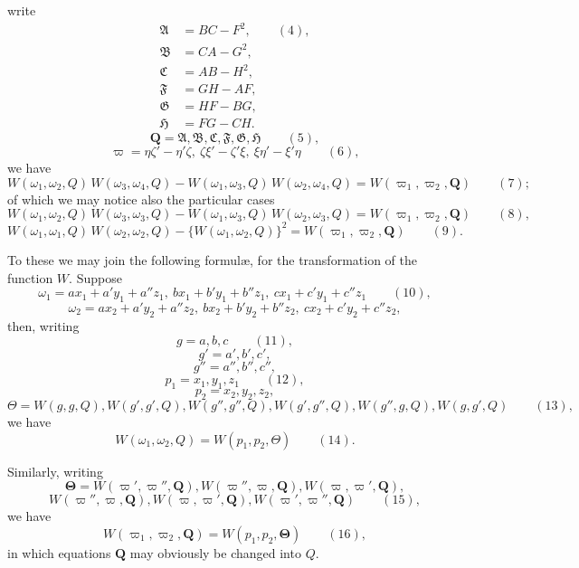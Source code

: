 \documentclass[11pt]{article}
\begin{document}
\newpage
\setcounter{page}{214}

write
\begin{align*}
\mathfrak{A} &= BC - F^2, \qquad (4),\\
\mathfrak{B} &= CA - G^2,\\
\mathfrak{C} &= AB - H^2,\\
\mathfrak{F} &= GH - AF,\\
\mathfrak{G} &= HF - BG,\\
\mathfrak{H} &= FG - CH.
\end{align*}
\[
\mathbf{Q} = \mathfrak{A}, \mathfrak{B}, \mathfrak{C}, \mathfrak{F}, \mathfrak{G}, \mathfrak{H} \qquad (5),
\]
\[
\varpi = \eta\zeta' - \eta'\zeta,\ \zeta\xi' - \zeta'\xi,\ \xi\eta' - \xi'\eta \qquad (6),
\]
we have
\[
W(\omega_1, \omega_2, Q)\,W(\omega_3, \omega_4, Q) - W(\omega_1, \omega_3, Q)\,W(\omega_2, \omega_4, Q) = W(\varpi_1, \varpi_2, \mathbf{Q}) \qquad (7);
\]
of which we may notice also the particular cases
\[
W(\omega_1, \omega_2, Q)\,W(\omega_3, \omega_3, Q) - W(\omega_1, \omega_3, Q)\,W(\omega_2, \omega_3, Q) = W(\varpi_1, \varpi_2, \mathbf{Q}) \qquad (8),
\]
\[
W(\omega_1, \omega_1, Q)\,W(\omega_2, \omega_2, Q) - \{W(\omega_1, \omega_2, Q)\}^2 = W(\varpi_1, \varpi_2, \mathbf{Q}) \qquad (9).
\]

To these we may join the following formul\ae{}, for the transformation of the function $W$. Suppose
\[
\omega_1 = ax_1 + a'y_1 + a''z_1,\ bx_1 + b'y_1 + b''z_1,\ cx_1 + c'y_1 + c''z_1 \qquad (10),
\]
\[
\omega_2 = ax_2 + a'y_2 + a''z_2,\ bx_2 + b'y_2 + b''z_2,\ cx_2 + c'y_2 + c''z_2,
\]
then, writing
\[
g = a, b, c \qquad (11),
\]
\[
g' = a', b', c',
\]
\[
g'' = a'', b'', c'',
\]
\[
p_1 = x_1, y_1, z_1 \qquad (12),
\]
\[
p_2 = x_2, y_2, z_2,
\]
\[
\Theta = W(g, g, Q), W(g', g', Q), W(g'', g'', Q), W(g', g'', Q), W(g'', g, Q), W(g, g', Q) \qquad (13),
\]
we have
\[
W(\omega_1, \omega_2, Q) = W(p_1, p_2, \Theta) \qquad (14).
\]

Similarly, writing
\[
\boldsymbol{\Theta} = W(\varpi', \varpi'', \mathbf{Q}), W(\varpi'', \varpi, \mathbf{Q}), W(\varpi, \varpi', \mathbf{Q}),
\]
\[
W(\varpi'', \varpi, \mathbf{Q}), W(\varpi, \varpi', \mathbf{Q}), W(\varpi', \varpi'', \mathbf{Q}) \qquad (15),
\]
we have
\[
W(\varpi_1, \varpi_2, \mathbf{Q}) = W(p_1, p_2, \boldsymbol{\Theta}) \qquad (16),
\]
in which equations $\mathbf{Q}$ may obviously be changed into $Q$.
\end{document}
